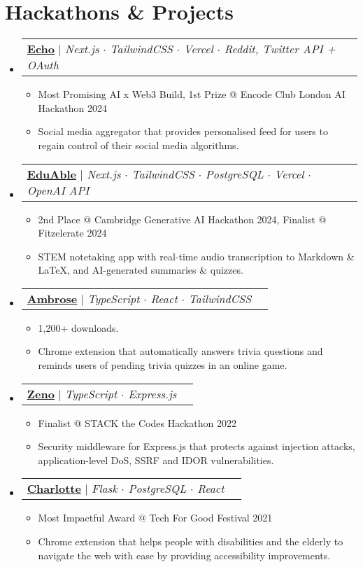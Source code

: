 \documentclass[letterpaper,10pt]{article}
\makeatletter
\newcommand{\link}[2]{\href{#1}{\color{blue}\underline{#2}}}
\newcommand{\resumeItem}[1]{
  \item\small{
    {#1 \vspace{-2pt}}
  }
}
\newcommand{\resumeProjectHeading}[2]{
  \item
  \begin{tabular*}{0.97\textwidth}{l@{\extracolsep{\fill}}r}
    \small#1 & #2 \\
  \end{tabular*}\vspace{-7pt}
}
\newcommand{\resumeSubHeadingListStart}{\begin{itemize}[leftmargin=0.15in, label={}]}
\newcommand{\resumeSubHeadingListEnd}{\end{itemize}}
\newcommand{\resumeItemListStart}{\begin{itemize}}
\newcommand{\resumeItemListEnd}{\end{itemize}\vspace{-5pt}}
\makeatother
\begin{document}
\section{Hackathons \& Projects}
\resumeSubHeadingListStart
\resumeProjectHeading
{\link{https://github.com/ECHO-LONDON/ECHO-Web}{\textbf{Echo}} $|$ \emph{Next.js $\cdot$ TailwindCSS $\cdot$ Vercel $\cdot$ Reddit, Twitter API + OAuth}}{}
\resumeItemListStart
\resumeItem{Most Promising AI x Web3 Build, 1st Prize @ Encode Club London AI Hackathon 2024}
\resumeItem{Social media aggregator that provides personalised feed for users to regain control of their social media algorithms.}
\resumeItemListEnd
\resumeProjectHeading
{\link{https://github.com/zeyu2001/EduAble}{\textbf{EduAble}} $|$ \emph{Next.js $\cdot$ TailwindCSS $\cdot$ PostgreSQL $\cdot$ Vercel $\cdot$ OpenAI API}}{}
\resumeItemListStart
\resumeItem{2nd Place @ Cambridge Generative AI Hackathon 2024, Finalist @ Fitzelerate 2024}
\resumeItem{STEM notetaking app with real-time audio transcription to Markdown \& LaTeX, and AI-generated summaries \& quizzes.}
\resumeItemListEnd
\resumeProjectHeading
{\link{https://github.com/zeyu2001/Ambrose}{\textbf{Ambrose}} $|$ \emph{TypeScript $\cdot$ React $\cdot$ TailwindCSS}}{}
\resumeItemListStart
\resumeItem{1,200+ downloads.}
\resumeItem{Chrome extension that automatically answers trivia questions and reminds users of pending trivia quizzes in an online game.}
\resumeItemListEnd
\resumeProjectHeading
{\link{https://github.com/sebasyii/zeno}{\textbf{Zeno}} $|$ \emph{TypeScript $\cdot$ Express.js}}{}
\resumeItemListStart
\resumeItem{Finalist @ STACK the Codes Hackathon 2022}
\resumeItem{Security middleware for Express.js that protects against injection attacks, application-level DoS, SSRF and IDOR vulnerabilities.}
\resumeItemListEnd
\resumeProjectHeading
{\link{https://chromewebstore.google.com/detail/charlotte/jkdoomkdcioheppgnmpakinhlgjflnem}{\textbf{Charlotte}} $|$ \emph{Flask $\cdot$ PostgreSQL $\cdot$ React}}{}
\resumeItemListStart
\resumeItem{Most Impactful Award @ Tech For Good Festival 2021}
\resumeItem{Chrome extension that helps people with disabilities and the elderly to navigate the web with ease by providing accessibility improvements.}
\resumeItemListEnd
\resumeSubHeadingListEnd
\end{document}
